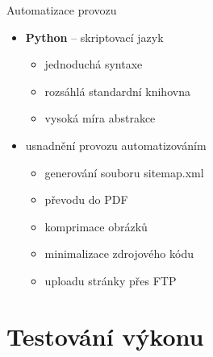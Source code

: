 \documentclass[14pt, hyperref={unicode}]{beamer}
\begin{document}
  \begin{frame}{Automatizace provozu}
    \pause
    \begin{itemize}[<+->]
      \item \textbf{Python} -- skriptovací jazyk
      \begin{itemize}
        \item jednoduchá syntaxe
        \item rozsáhlá standardní knihovna
        \item vysoká míra abstrakce
      \end{itemize}
    \end{itemize}

    \begin{itemize}
      \item<+-> usnadnění provozu automatizováním
      \begin{itemize}[<+->]
        \item generování souboru sitemap.xml
        \item převodu do PDF
        \item komprimace obrázků
        \item minimalizace zdrojového kódu
        \item uploadu stránky přes FTP
      \end{itemize}
    \end{itemize}
  \end{frame}

  \section{Testování výkonu}
\end{document}
